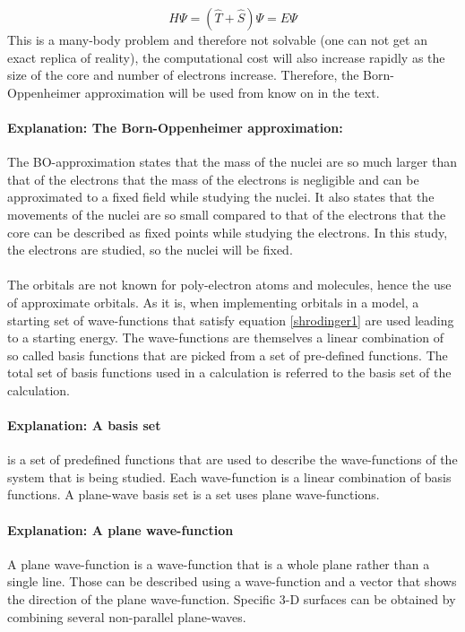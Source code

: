 \documentclass[10pt,a4paper]{article}
\begin{document}
\begin{equation} \label{shrodinger1}
H \Psi = ( \hat{T} + \hat{S}) \Psi = E \Psi
\end{equation}
This is a many-body problem and therefore not solvable (one can not get an exact replica of reality), the computational cost will also increase rapidly as the size of the core and number of electrons increase. Therefore, the Born-Oppenheimer approximation will be used from know on in the text.

\paragraph{Explanation: The Born-Oppenheimer approximation:}
The BO-approximation states that the mass of the nuclei are so much larger than that of the electrons that the mass of the electrons is negligible and can be approximated to a fixed field while studying the nuclei. It also states that the movements of the nuclei are so small compared to that of the electrons that the core can be described as fixed points while studying the electrons. In this study, the electrons are studied, so the nuclei will be fixed. 

\paragraph*{}
 The orbitals are not known for poly-electron atoms and molecules, hence the use of approximate orbitals. As it is, when implementing orbitals in a model,  a starting set of wave-functions that satisfy equation \ref{shrodinger1} are used leading to a starting energy. The wave-functions are themselves a linear combination of so called basis functions that are picked from a set of pre-defined functions. The total set of basis functions used in a calculation is referred to the basis set of the calculation. 

\paragraph{Explanation: A basis set} is a set of predefined functions that are used to describe the wave-functions of the system that is being studied. Each wave-function is a linear combination of basis functions. \cite{burke} A plane-wave basis set is a set uses plane wave-functions.

\paragraph{Explanation: A plane wave-function}
A plane wave-function  is a wave-function that is a whole plane rather than a single line. Those can be described using a wave-function and a vector that shows the direction of the plane wave-function. Specific 3-D surfaces can be obtained by combining several non-parallel plane-waves. 
\end{document}
